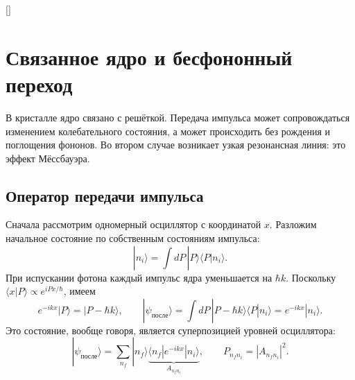 \documentclass[../final.tex]{subfiles}
\begin{document}
\begin{rbox}[unbreakable,left=14pt,right=14pt,top=7pt,bottom=6pt]{[]}
\centering
\captionsetup{font=footnotesize,hypcap=false,skip=5pt}
\end{rbox}

\clearpage
\section{Связанное ядро и бесфононный переход}
В кристалле ядро связано с решёткой. Передача импульса может сопровождаться
изменением колебательного состояния, а может происходить без рождения
и поглощения фононов. Во втором случае возникает узкая резонансная линия:
это эффект Мёссбауэра.

\subsection{Оператор передачи импульса}
Сначала рассмотрим одномерный осциллятор с координатой $x$.
Разложим начальное состояние по собственным состояниям импульса:
\begin{equation*}
 |n_i\rangle=\int dP\,|P\rangle\langle P|n_i\rangle.
\end{equation*}
При испускании фотона каждый импульс ядра уменьшается на $\hbar k$.
Поскольку $\langle x|P\rangle\propto e^{iPx/\hbar}$, имеем
\begin{equation*}
 e^{-ikx}|P\rangle=|P-\hbar k\rangle,
 \qquad
 |\psi_{\text{после}}\rangle
 =\int dP\,|P-\hbar k\rangle\langle P|n_i\rangle
 =e^{-ikx}|n_i\rangle.
\end{equation*}
Это состояние, вообще говоря, является суперпозицией уровней осциллятора:
\begin{equation*}
 |\psi_{\text{после}}\rangle=\sum_{n_f}|n_f\rangle
 \underbrace{\langle n_f|e^{-ikx}|n_i\rangle}_{A_{n_fn_i}},
 \qquad P_{n_fn_i}=|A_{n_fn_i}|^2.
\end{equation*}
\end{document}
